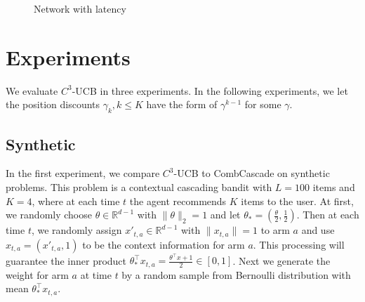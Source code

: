 \documentclass{article}
\newcommand{\RR}{\mathbb{R}}
\begin{document}
\begin{figure}
	\centering
	\caption{Network with latency}
	\label{fig:network} %
\end{figure}

\section{Experiments}

We evaluate $C^3$-UCB in three experiments. In the following experiments, we let the position discounts $\gamma_k, k\leq K$ have the form of $\gamma^{k-1}$ for some $\gamma$. 

\subsection{Synthetic}
\label{sec:ExpSyn}

In the first experiment, we compare $C^3$-UCB to CombCascade on synthetic problems. This problem is a contextual cascading bandit with $L=100$ items and $K=4$, where at each time $t$ the agent recommends $K$ items to the user. At first, we randomly choose $\theta \in \RR^{d-1}$ with $\|\theta \|_2 = 1$ and let $\theta_* = (\frac{\theta}{2}, \frac{1}{2})$. Then at each time $t$, we randomly assign $x'_{t,a} \in \RR^{d-1}$ with $\|x_{t,a}\| = 1$ to arm $a$ and use $x_{t,a} = (x'_{t,a}, 1)$ to be the context information for arm $a$. This processing will guarantee the inner product $\theta_*^{\top}x_{t,a} = \frac{\theta^{\top}x + 1}{2} \in [0,1]$. Next we generate the weight for arm $a$ at time $t$ by a random sample from Bernoulli distribution with mean $\theta_*^{\top}x_{t,a}$.
\end{document}
